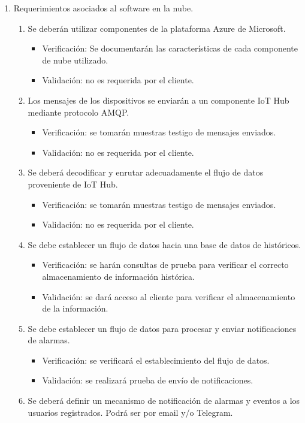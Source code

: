 \documentclass[
11pt, %
]{charter}
\begin{document}
\begin{enumerate}
	\item Requerimientos asociados al software en la nube.
		\begin{enumerate}
			\item Se deberán utilizar componentes de la plataforma Azure de Microsoft.
			\begin{itemize}
				\item Verificación: Se documentarán las características de cada componente de nube utilizado.
				\item Validación: no es requerida por el cliente.
			\end{itemize}
			\item Los mensajes de los dispositivos se enviarán a un componente IoT Hub mediante protocolo AMQP.
			\begin{itemize}
				\item Verificación: se tomarán muestras testigo de mensajes enviados.
				\item Validación: no es requerida por el cliente.
			\end{itemize}
			\item Se deberá decodificar y enrutar adecuadamente el flujo de datos proveniente de IoT Hub.
			\begin{itemize}
				\item Verificación: se tomarán muestras testigo de mensajes enviados.
				\item Validación: no es requerida por el cliente.
			\end{itemize}
			\item Se debe establecer un flujo de datos hacia una base de datos de históricos.
			\begin{itemize}
				\item Verificación: se harán consultas de prueba para verificar el correcto almacenamiento de información histórica.
				\item Validación: se dará acceso al cliente para verificar el almacenamiento de la información.
			\end{itemize}
			\item Se debe establecer un flujo de datos para procesar y enviar notificaciones de alarmas.
			\begin{itemize}
				\item Verificación: se verificará el establecimiento del flujo de datos.
				\item Validación: se realizará prueba de envío de notificaciones.
			\end{itemize}
			\item Se deberá definir un mecanismo de notificación de alarmas y eventos a los usuarios registrados. Podrá ser por email y/o Telegram.

\end{enumerate}
\end{enumerate}
\end{document}
